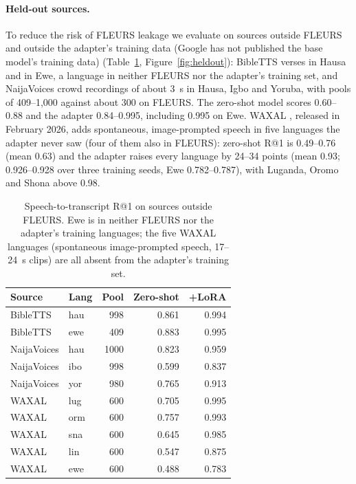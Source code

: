 \documentclass[11pt]{article}
\makeatletter
\newcommand{\rone}{R@1}
\makeatother
\begin{document}
\paragraph{Held-out sources.}
To reduce the risk of FLEURS leakage we evaluate on sources outside FLEURS and outside the adapter's training data (Google has not published the base model's training data) (Table~\ref{tab:heldout}, Figure~\ref{fig:heldout}): BibleTTS verses in
Hausa and in Ewe, a language in neither FLEURS nor the adapter's training set,
and NaijaVoices crowd recordings of about 3~s in Hausa, Igbo and Yoruba, with pools of 409--1,000 against about 300 on FLEURS. The zero-shot model scores
0.60--0.88 and the adapter 0.84--0.995, including 0.995 on Ewe. WAXAL
\citep{waxal2026}, released in February 2026, adds spontaneous, image-prompted speech
in five languages the adapter never saw (four of them also in FLEURS): zero-shot \rone{} is 0.49--0.76
(mean 0.63) and the adapter raises every language by 24--34 points (mean
0.93; 0.926--0.928 over three training seeds, Ewe 0.782--0.787), with Luganda, Oromo and Shona above 0.98.

\begin{table}[t]
  \centering
  \small
  \begin{tabular}{llrrr}
    \toprule
    Source & Lang & Pool & Zero-shot & +LoRA \\
    \midrule
    BibleTTS    & hau & 998  & 0.861 & 0.994 \\
    BibleTTS    & ewe & 409  & 0.883 & 0.995 \\
    NaijaVoices & hau & 1000 & 0.823 & 0.959 \\
    NaijaVoices & ibo & 998  & 0.599 & 0.837 \\
    NaijaVoices & yor & 980  & 0.765 & 0.913 \\
    \midrule
    WAXAL       & lug & 600 & 0.705 & 0.995 \\
    WAXAL       & orm & 600 & 0.757 & 0.993 \\
    WAXAL       & sna & 600 & 0.645 & 0.985 \\
    WAXAL       & lin & 600 & 0.547 & 0.875 \\
    WAXAL       & ewe & 600 & 0.488 & 0.783 \\
    \bottomrule
  \end{tabular}
  \caption{Speech-to-transcript \rone{} on sources outside FLEURS. Ewe is in
  neither FLEURS nor the adapter's training languages; the five WAXAL
  languages (spontaneous image-prompted speech, 17--24~s clips) are all absent from the
  adapter's training set.}
  \label{tab:heldout}
\end{table}
\end{document}

